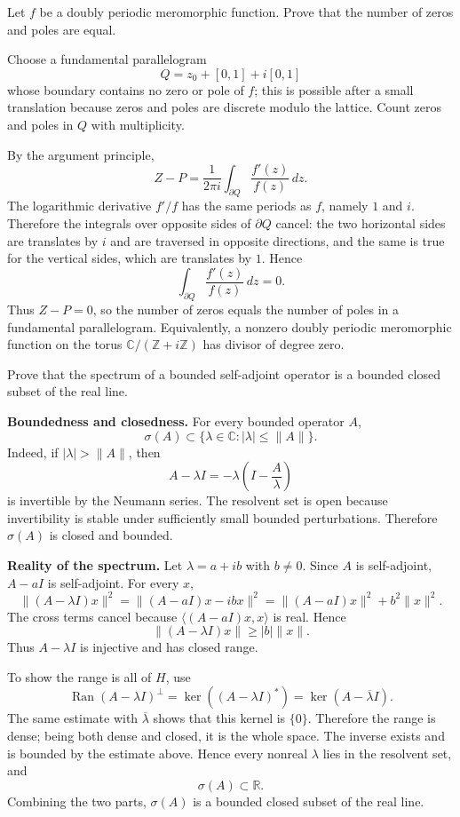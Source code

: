 \begin{exercise}
\label{analysis:2016:5}
Let $f$ be a doubly periodic meromorphic function. Prove that the number of zeros and poles are equal.
\end{exercise}

\begin{solution}
Choose a fundamental parallelogram
\[
Q=z_0+[0,1]+i[0,1]
\]
whose boundary contains no zero or pole of $f$; this is possible after a small translation because zeros and poles are discrete modulo the lattice. Count zeros and poles in $Q$ with multiplicity.

By the argument principle,
\[
Z-P=\frac{1}{2\pi i}\int_{\partial Q}\frac{f'(z)}{f(z)}\,dz.
\]
The logarithmic derivative $f'/f$ has the same periods as $f$, namely $1$ and $i$. Therefore the integrals over opposite sides of $\partial Q$ cancel: the two horizontal sides are translates by $i$ and are traversed in opposite directions, and the same is true for the vertical sides, which are translates by $1$. Hence
\[
\int_{\partial Q}\frac{f'(z)}{f(z)}\,dz=0.
\]
Thus $Z-P=0$, so the number of zeros equals the number of poles in a fundamental parallelogram. Equivalently, a nonzero doubly periodic meromorphic function on the torus $\mathbb C/(\mathbb Z+i\mathbb Z)$ has divisor of degree zero.
\end{solution}

\begin{exercise}
\label{analysis:2016:6}
Prove that the spectrum of a bounded self-adjoint operator is a bounded closed subset of the real line.
\end{exercise}

\begin{solution}
\textbf{Boundedness and closedness.}
For every bounded operator $A$,
\[
\sigma(A)\subset \{\lambda\in\mathbb C:|\lambda|\leq \|A\|\}.
\]
Indeed, if $|\lambda|>\|A\|$, then
\[
A-\lambda I=-\lambda\left(I-\frac{A}{\lambda}\right)
\]
is invertible by the Neumann series. The resolvent set is open because invertibility is stable under sufficiently small bounded perturbations. Therefore $\sigma(A)$ is closed and bounded.

\textbf{Reality of the spectrum.}
Let $\lambda=a+ib$ with $b\neq 0$. Since $A$ is self-adjoint, $A-aI$ is self-adjoint. For every $x$,
\[
\|(A-\lambda I)x\|^2
=\|(A-aI)x-ibx\|^2
=\|(A-aI)x\|^2+b^2\|x\|^2.
\]
The cross terms cancel because $\langle (A-aI)x,x\rangle$ is real. Hence
\[
\|(A-\lambda I)x\|\geq |b|\|x\|.
\]
Thus $A-\lambda I$ is injective and has closed range.

To show the range is all of $H$, use
\[
\operatorname{Ran}(A-\lambda I)^\perp=\ker((A-\lambda I)^*)=\ker(A-\overline{\lambda}I).
\]
The same estimate with $\overline{\lambda}$ shows that this kernel is $\{0\}$. Therefore the range is dense; being both dense and closed, it is the whole space. The inverse exists and is bounded by the estimate above. Hence every nonreal $\lambda$ lies in the resolvent set, and
\[
\sigma(A)\subset\mathbb R.
\]
Combining the two parts, $\sigma(A)$ is a bounded closed subset of the real line.
\end{solution}


